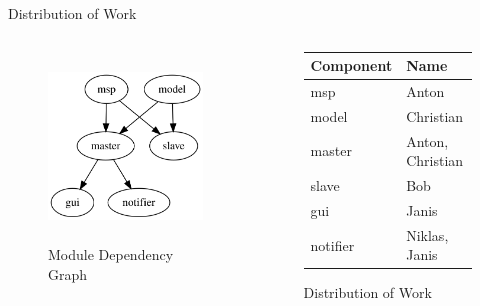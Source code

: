 \documentclass[11pt,aspectratio=169]{beamer}
\begin{document}
    \begin{frame}[allowframebreaks]{Distribution of Work}
        
        \begin{columns}
            \begin{column}{0.5\linewidth}
                \centering
                \begin{figure}[h]
                    \includegraphics[height=5cm]{assets/module_graph}
                    \caption{Module Dependency Graph}
                \end{figure}
            \end{column}
           
            \begin{column}{0.5\linewidth}
                 \centering
                 \begin{figure}[h]
                     \begin{tabular}{l|l}
                         \toprule
                         Component & Name\\
                         \midrule
                         msp       & Anton\\
                         model     & Christian\\
                         master    & Anton, Christian\\
                         slave     & Bob\\
                         gui       & Janis\\
                         notifier  & Niklas, Janis\\
                         \bottomrule
                        \end{tabular}
                        \caption{Distribution of Work}
                    \end{figure}
            \end{column}
        \end{columns}
        
    \end{frame}
\end{document}
